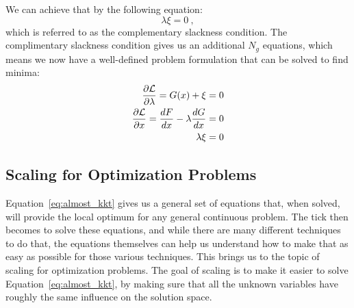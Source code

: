 \documentclass[conf]{new-aiaa}
\begin{document}
        We can achieve that by the following equation: 
        \begin{equation}
            \lambda \xi = 0 \ , 
        \end{equation}
        which is referred to as the complementary slackness condition. 
        The complimentary slackness condition gives us an additional $N_g$ equations, which means we now have a well-defined problem formulation that can be solved to find minima: 
        \begin{align}
            \frac{\partial \mathcal{L}}{\partial \lambda} = G(x) + \xi &= 0 \notag \\
            \frac{\partial \mathcal{L}}{\partial x} = \frac{dF}{dx} - \lambda \frac{dG}{dx} &= 0 \notag \\
            \lambda \xi &= 0
            \label{eq:almost_kkt}
        \end{align}

    \subsection{Scaling for Optimization Problems}

    Equation~\eqref{eq:almost_kkt} gives us a general set of equations that, when solved, will provide the local optimum for any general continuous problem. 
    The tick then becomes to solve these equations, and while there are many different techniques to do that, the equations themselves can help us understand how to make that as easy as possible for those various techniques. 
    This brings us to the topic of scaling for optimization problems. 
    The goal of {}scaling is to make it easier to solve Equation~\eqref{eq:almost_kkt}, by making sure that all the unknown variables have roughly the same influence on the solution space. 
\end{document}
